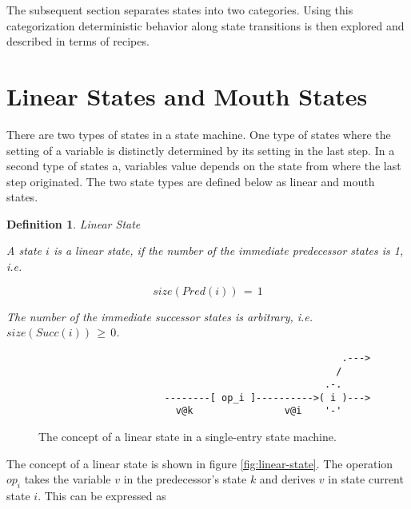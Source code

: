 \documentclass[12pt,a4paper]{scrartcl}
\newtheorem{definition}{Definition}
\begin{document}
The subsequent section separates states into two categories.  Using this
categorization deterministic behavior along state transitions is then explored
and described in terms of recipes.

%
\section{Linear States and Mouth States}

There are two types of states in a state machine. One type of states where the
setting of a variable is distinctly determined by its setting in the last step.
In a second type of states a, variables value depends on the state from where the
last step originated.  The two state types are defined below as linear and
mouth states.

\begin{definition} Linear State

    A state $i$ is a linear state, if the number of the immediate predecessor 
    states is 1, i.e. 

    \begin{equation}
                               size(Pred(i))\,=\,1
    \end{equation}

    The number of the immediate successor states is arbitrary, i.e.
    $size(Succ(i))\,\ge\,0$.

\end{definition}

\begin{figure}[htbp] \leavevmode \label{fig:linear-state}
\begin{verbatim}
                                                     .---> 
                                                    /
                                                  .-.
                      --------[ op_i ]---------->( i )---> 
                        v@k                v@i    '-'

\end{verbatim}
\caption{The concept of a linear state in a single-entry state machine.}
\end{figure}

The concept of a linear state is shown in figure \eqref{fig:linear-state}. The
operation $op_i$ takes the variable $v$ in the predecessor's state $k$ and
derives $v$ in state current state $i$. This can be expressed as 
\end{document}
